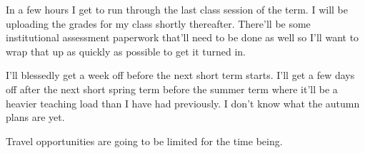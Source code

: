 In a few hours I get to run through the last class session of the term.
I will be uploading the grades for my class shortly thereafter. There'll
be some institutional assessment paperwork that'll need to be done as
well so I'll want to wrap that up as quickly as possible to get it
turned in.

I'll blessedly get a week off before the next short term starts. I'll
get a few days off after the next short spring term before the summer
term where it'll be a heavier teaching load than I have had previously.
I don't know what the autumn plans are yet.

Travel opportunities are going to be limited for the time being.
